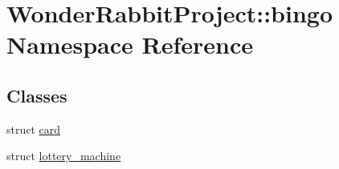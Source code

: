 \hypertarget{namespaceWonderRabbitProject_1_1bingo}{\section{Wonder\-Rabbit\-Project\-:\-:bingo Namespace Reference}
\label{namespaceWonderRabbitProject_1_1bingo}
}
\subsection*{Classes}
\begin{DoxyCompactItemize}
\item 
struct \hyperlink{structWonderRabbitProject_1_1bingo_1_1card}{card}
\item 
struct \hyperlink{structWonderRabbitProject_1_1bingo_1_1lottery__machine}{lottery\-\_\-machine}
\end{DoxyCompactItemize}
